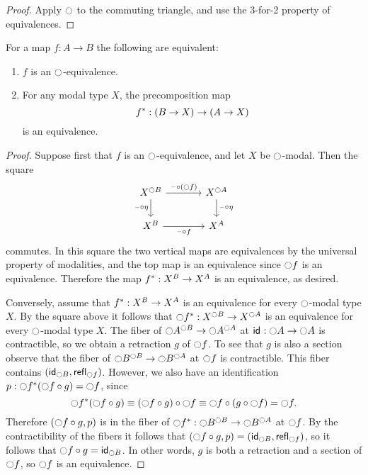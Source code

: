 \documentclass[9pt,twosided]{amsart}
\begin{document}
\begin{proof}
Apply $\modal$ to the commuting triangle, and use the 3-for-2 property of equivalences.
\end{proof}

\begin{lem}\label{lem:modal_equivalence}
For a map $f : A \to B$ the following are equivalent:
\begin{enumerate}
\item $f$ is an $\modal$-equivalence.
\item For any modal type $X$, the precomposition map
\begin{equation*}
\precomp{f} : (B \to X) \to (A \to X)
\end{equation*}
is an equivalence.
\end{enumerate}
\end{lem}

\begin{proof} 
Suppose first that $f$ is an $\modal$-equivalence, and let $X$ be $\modal$-modal. Then the square
\begin{equation*}
\begin{tikzcd}[column sep=large]
X^{\modal B} \arrow[r,"\blank\circ (\modal f)"] \arrow[d,swap,"\blank\circ\eta"] & X^{\modal A} \arrow[d,"\blank\circ\eta"] \\
X^{B} \arrow[r,swap,"\blank\circ f"] & X^A
\end{tikzcd}
\end{equation*}
commutes. In this square the two vertical maps are equivalences by the universal property of modalities, and the top map is an equivalence since $\modal f$ is an equivalence. Therefore the map $\precomp{f}:X^B\to X^A$ is an equivalence, as desired.

Conversely, assume that $\precomp{f} : X^B \to X^A$ is an equivalence for every $\modal$-modal type $X$. By the square above it follows that $\precomp{\modal f}:X^{\modal B}\to X^{\modal A}$ is an equivalence for every $\modal$-modal type $X$. The fiber of $\modal A^{\modal B}\to \modal A^{\modal A}$ at $\idfunc:\modal A\to \modal A$ is contractible, so we obtain a retraction $g$ of $\modal f$. To see that $g$ is also a section observe that the fiber of $\modal B^{\modal B}\to \modal B^{\modal A}$ at $\modal f$ is contractible. This fiber contains $(\idfunc[\modal B],\refl{\modal f})$. However, we also have an identification $p:\precomp{\modal f}(\modal f\circ g)=\modal f$, since
\begin{equation*}
\precomp{\modal f}(\modal f\circ g)\jdeq (\modal f \circ g)\circ \modal f\jdeq \modal f \circ (g\circ \modal f) = \modal f. 
\end{equation*}
Therefore $(\modal f\circ g,p)$ is in the fiber of $\precomp{\modal f}:\modal B^{\modal B}\to \modal B^{\modal A}$ at $\modal f$. By the contractibility of the fibers it follows that $(\modal f\circ g,p)=(\idfunc[\modal B],\refl{\modal f})$, so it follows that $\modal f\circ g=\idfunc[\modal B]$. In other words, $g$ is both a retraction and a section of $\modal f$, so $\modal f$ is an equivalence.
\end{proof}
\end{document}
